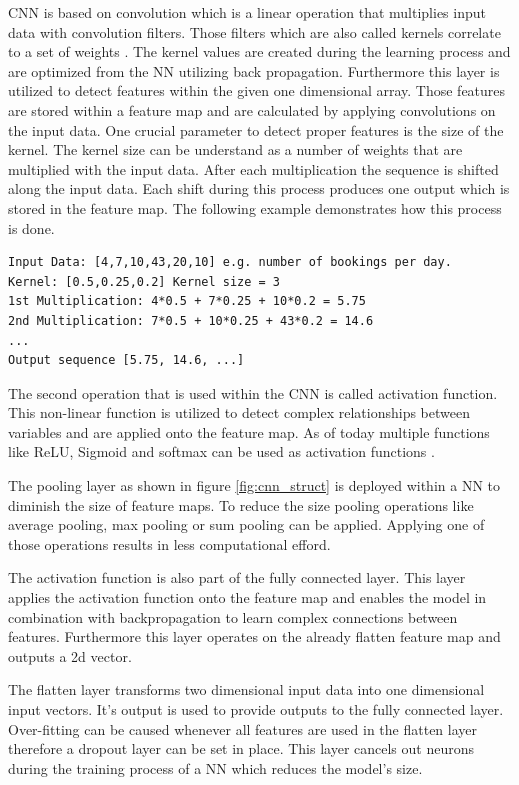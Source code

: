 CNN is based on convolution which is a linear operation that multiplies input data with convolution filters. Those filters which are also called kernels correlate to a set of weights \cite{cnn_vechicle}. The kernel values are created during the learning process and are optimized from the NN utilizing back propagation. Furthermore this layer is utilized to detect features within the given one dimensional array. Those features are stored within a feature map and are calculated by applying convolutions on the input data. One crucial parameter to detect proper features is the size of the kernel. The kernel size can be understand as a number of weights that are multiplied with the input data. After each multiplication the sequence is shifted along the input data. Each shift during this process produces one output which is stored in the feature map. The following example demonstrates how this process is done.\cite{1d_cnn}
\begin{lstlisting}
Input Data: [4,7,10,43,20,10] e.g. number of bookings per day. 
Kernel: [0.5,0.25,0.2] Kernel size = 3
1st Multiplication: 4*0.5 + 7*0.25 + 10*0.2 = 5.75
2nd Multiplication: 7*0.5 + 10*0.25 + 43*0.2 = 14.6
...
Output sequence [5.75, 14.6, ...]
\end{lstlisting}
The second operation that is used within the CNN is called activation function. This non-linear function is utilized to detect complex relationships between variables and are applied onto the feature map. As of today multiple functions like ReLU, Sigmoid and softmax can be used as activation functions \cite{cnn_basic3}.

The pooling layer as shown in figure \ref{fig:cnn_struct} is deployed within a NN to diminish the size of feature maps. To reduce the size pooling operations like average pooling, max pooling or sum pooling can be applied. Applying one of those operations results in less computational efford.\cite{cnn_basic}

The activation function is also part of the fully connected layer. This layer applies the activation function onto the feature map and enables the model in combination with backpropagation to learn complex connections between features. Furthermore this layer operates on the already flatten feature map and outputs a 2d vector.\cite{1d_cnn}

The flatten layer transforms two dimensional input data into one dimensional input vectors. It's output is used to provide outputs to the fully connected layer. Over-fitting can be caused whenever all features are used in the flatten layer therefore a dropout layer can be set in place. This layer cancels out neurons during the training process of a NN which reduces the model's size. 

